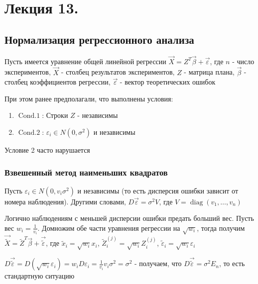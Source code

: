 \documentclass[12pt]{article}
\begin{document}






\section{Лекция 13.}

\subsection{Нормализация регрессионного анализа}

Пусть имеется уравнение общей линейной регрессии $\vec X = Z^T \vec \beta + \vec \varepsilon$, где $n$ - число экспериментов, $\vec X$ - столбец результатов экспериментов, $Z$ - матрица плана, $\vec \beta$ - столбец коэффициентов регрессии, $\vec \varepsilon$ - вектор теоретических ошибок

При этом ранее предполагали, что выполнены условия:

\begin{enumerate}
    \item $\operatorname{Cond. 1}$: Строки $Z$ - независимы
    \item $\operatorname{Cond. 2}$: $\varepsilon_i \in N(0, \sigma^2)$ и независимы
\end{enumerate}

Условие 2 часто нарушается

\hypertarget{weighted_mls}{}

\subsubsection{Взвешенный метод наименьших квадратов}

Пусть $\varepsilon_i \in N(0, v_i \sigma^2)$ и независимы (то есть дисперсия ошибки зависит от номера наблюдения). Другими словами, $D \vec \varepsilon = \sigma^2 V$, где $V = \operatorname{diag} (v_1, \dots, v_n)$

Логично наблюдениям с меньшей дисперсии ошибки предать больший вес. Пусть вес $w_i = \frac{1}{v_i}$. Домножим обе части уравнения регрессии на $\sqrt{w_i}$, тогда получим $\vec \tilde{X} = \tilde Z^T \vec \beta + \vec \tilde{\varepsilon}$, где $\tilde x_i=  \sqrt{w_i} x_i$, $\tilde Z^{(j)}_i = \sqrt{w_i} Z^{(j)}_i$, $\tilde \varepsilon_i = \sqrt{w_i} \varepsilon_i$

$D \vec \tilde{\varepsilon} = D(\sqrt{w_i} \varepsilon_i) = w_i D \varepsilon_i = \frac{1}{v_i} v_i \sigma^2 = \sigma^2$ - получаем, что $D \vec \tilde{\varepsilon} = \sigma^2 E_n$, то есть стандартную ситуацию
\end{document}
